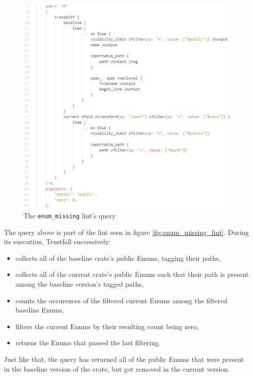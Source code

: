 \documentclass[licencjacka,en]{pracamgr}
\begin{document}
\begin{figure}[h]
	\centering
	\includegraphics[width=\linewidth]{lint-query-example.png}
	\caption{The \texttt{enum\_missing} lint's query}
	\label{fig:enum_missing_lint_query}
\end{figure}

The query above is part of the lint seen in figure \ref{fig:enum_missing_lint}.
During its execution, Trustfall successively:
\begin{itemize}
	\item collects all of the baseline crate's public Enums, tagging their paths,
	\item collects all of the current crate's public Enums such that their path is present among
		the baseline version's tagged paths,
	\item counts the occurences of the filtered current Enums among the filtered baseline Enums,
	\item filters the current Enums by their resulting count being zero,
	\item returns the Enums that passed the last filtering.
\end{itemize}
Just like that, the query has returned all of the public Enums that were present in the baseline
version of the crate, but got removed in the current version.
\end{document}
